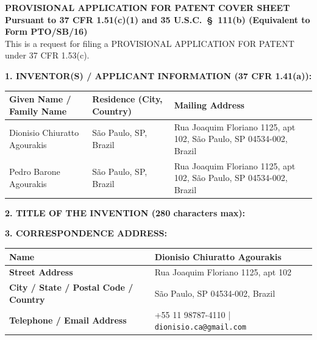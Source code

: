 \documentclass[11pt,letterpaper]{article}
\begin{document}
\begin{center}
    {\large \textbf{PROVISIONAL APPLICATION FOR PATENT COVER SHEET}}\\[2pt]
    {\small \textbf{Pursuant to 37 CFR 1.51(c)(1) and 35 U.S.C.\ \S\ 111(b) (Equivalent to Form PTO/SB/16)}}\\[4pt]
    {\footnotesize This is a request for filing a PROVISIONAL APPLICATION FOR PATENT under 37 CFR 1.53(c).}
\end{center}
\vspace{4pt}

\textbf{1. INVENTOR(S) / APPLICANT INFORMATION (37 CFR 1.41(a)):}\\[2pt]
\begin{tabular}{|p{2.3in}|p{1.6in}|p{2.6in}|}
\hline
\textbf{Given Name / Family Name} & \textbf{Residence (City, Country)} & \textbf{Mailing Address} \\
\hline
Dionisio Chiuratto Agourakis & S\~ao Paulo, SP, Brazil & Rua Joaquim Floriano 1125, apt 102, S\~ao Paulo, SP 04534-002, Brazil \\
\hline
Pedro Barone Agourakis & S\~ao Paulo, SP, Brazil & Rua Joaquim Floriano 1125, apt 102, S\~ao Paulo, SP 04534-002, Brazil \\
\hline
\end{tabular}

\vspace{6pt}
\textbf{2. TITLE OF THE INVENTION (280 characters max):}\\[2pt]

\vspace{6pt}
\textbf{3. CORRESPONDENCE ADDRESS:}\\[2pt]
\begin{tabular}{|p{2.2in}|p{4.5in}|}
\hline
\textbf{Name} & Dionisio Chiuratto Agourakis \\
\hline
\textbf{Street Address} & Rua Joaquim Floriano 1125, apt 102 \\
\hline
\textbf{City / State / Postal Code / Country} & S\~ao Paulo, SP 04534-002, Brazil \\
\hline
\textbf{Telephone / Email Address} & +55 11 98787-4110 \quad | \quad \texttt{dionisio.ca@gmail.com} \\
\hline
\end{tabular}
\end{document}
